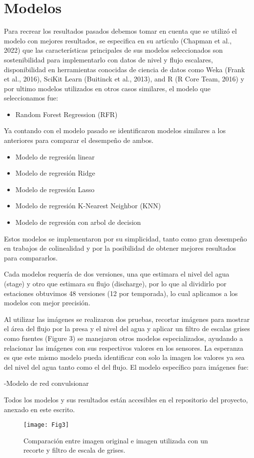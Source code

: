 \documentclass[../main.tex]{subfiles}
\begin{document}
\section{Modelos}

Para recrear los resultados pasados debemos tomar en cuenta que se utilizó el modelo con mejores resultados, se especifica en su artículo (Chapman et al., 2022) que las características principales  de sus modelos seleccionados son sostenibilidad para implementarlo con datos de nivel y flujo escalares, disponibilidad en herramientas conocidas de ciencia de datos como Weka (Frank et al., 2016), SciKit Learn (Buitinck et al., 2013), and R (R Core Team, 2016) y por ultimo modelos utilizados en otros casos similares, el modelo que seleccionamos fue:

\begin{itemize}
    \item Random Forest Regression (RFR)
\end{itemize}

Ya contando con el modelo pasado se identificaron modelos similares a los anteriores para comparar el desempeño de ambos. 

\begin{itemize}
    \item Modelo de regresión linear
    \item Modelo de regresión Ridge
    \item Modelo de regresión Lasso
    \item Modelo de regresión K-Nearest Neighbor (KNN)
    \item Modelo de regresión con arbol de decision
\end{itemize}

Estos modelos se implementaron por su simplicidad, tanto como gran desempeño en trabajos de colinealidad y por la posibilidad de obtener mejores resultados para compararlos.

Cada modelos requería de dos versiones, una que estimara el nivel del agua (stage) y otro que estimara su flujo (discharge), por lo que al dividirlo por estaciones obtuvimos 48 versiones (12 por temporada), lo cual aplicamos a los modelos con mejor precisión.

Al utilizar las imágenes se realizaron dos pruebas, recortar imágenes para mostrar el área del flujo por la presa y el nivel del agua y aplicar un filtro de escalas grises como fuentes (Figure 3) se manejaron otros modelos especializados, ayudando a relacionar las imágenes con sus respectivos valores en los sensores.  La esperanza es que este mismo modelo pueda identificar con solo la imagen los valores ya sea del nivel del agua tanto como el del flujo. El modelo específico para imágenes fue:

-Modelo de red convulsionar

Todos los modelos y sus resultados están accesibles en el repositorio del proyecto, anexado en este escrito.


\begin{figure}[h]
\centering
\texttt{[image: Fig3]}
\caption{Comparación entre imagen original e imagen utilizada con un recorte y filtro de escala de grises.}
\end{figure}
\end{document}
